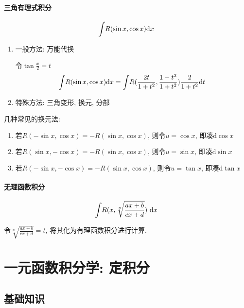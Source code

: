 \subsubsection{三角有理式积分}
\begin{equation*}
\displaystyle\int_{}\hspace{.2em}R(\sin x, \cos x)\mathrm{d}x
\end{equation*}\par
\begin{enumerate}
\item 一般方法: 万能代换 \par
令$ \tan \frac{x}{2}=t $
\begin{equation*}
\displaystyle\int_{}\hspace{.2em}R(\sin x, \cos x)\mathrm{d}x=\displaystyle\int_{}\hspace{.2em}R(\frac{2t}{1+t^{2}}, \frac{1-t^{2}}{1+t^{2}})\frac{2}{1+t^{2}}\mathrm{d}t
\end{equation*}
\item 特殊方法: 三角变形, 换元, 分部
\end{enumerate}
\begin{tcolorbox}
几种常见的换元法:
\begin{enumerate}
\item 若$ R(-\sin x, \cos x)=-R(\sin x, \cos x) $, 则令$ u=\cos x $, 即凑$ \mathrm{d}\cos x $
\item 若$ R(\sin x, -\cos x)=-R(\sin x, \cos x) $, 则令$ u=\sin x $, 即凑$ \mathrm{d}\sin x $
\item 若$ R(-\sin x, -\cos x)=-R(\sin x, \cos x) $, 则令$ u=\tan x $, 即凑$ \mathrm{d}\tan x $
\end{enumerate}
\end{tcolorbox}
\subsubsection{无理函数积分}
\begin{equation*}
\displaystyle\int_{}\hspace{.2em}R(x, \sqrt[n]{\frac{ax+b}{cx+d}})\ \mathrm{d}x
\end{equation*}\par
令$ \sqrt[n]{\frac{ax+b}{cx+d}}=t $, 将其化为有理函数积分进行计算.
\chapter{一元函数积分学: 定积分}
\section{基础知识}
